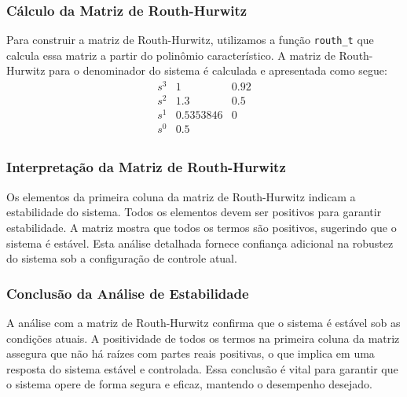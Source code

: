 \subsubsection{Cálculo da Matriz de Routh-Hurwitz}

Para construir a matriz de Routh-Hurwitz, utilizamos a função \texttt{routh\_t} que calcula essa matriz a partir do polinômio característico. A matriz de Routh-Hurwitz para o denominador do sistema é calculada e apresentada como segue:
\[
    \begin{array}{c|cc}
        s^3 & 1          & 0.92 \\
        s^2 & 1.3        & 0.5  \\
        s^1 & 0.5353846  & 0    \\
        s^0 & 0.5        &      \\
    \end{array}
\]

\subsubsection{Interpretação da Matriz de Routh-Hurwitz}

Os elementos da primeira coluna da matriz de Routh-Hurwitz indicam a estabilidade do sistema. Todos os elementos devem ser positivos para garantir estabilidade. A matriz mostra que todos os termos são positivos, sugerindo que o sistema é estável. Esta análise detalhada fornece confiança adicional na robustez do sistema sob a configuração de controle atual.

\subsubsection{Conclusão da Análise de Estabilidade}

A análise com a matriz de Routh-Hurwitz confirma que o sistema é estável sob as condições atuais. A positividade de todos os termos na primeira coluna da matriz assegura que não há raízes com partes reais positivas, o que implica em uma resposta do sistema estável e controlada. Essa conclusão é vital para garantir que o sistema opere de forma segura e eficaz, mantendo o desempenho desejado.
